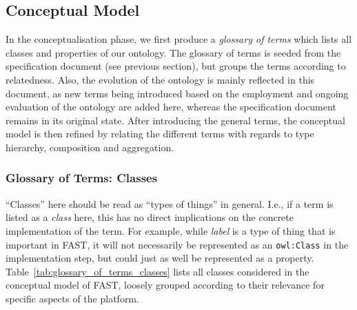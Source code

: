 \documentclass{article}
\begin{document}
\doublespacing


\subsection{Conceptual Model} %
\label{sub:conceptualisation}

In the conceptualisation phase, we first produce a \emph{glossary of terms} which lists all classes and properties of our ontology. The glossary of terms is seeded from the specification document (see previous section), but groups the terms according to relatedness. Also, the evolution of the ontology is mainly reflected in this document, as new terms being introduced based on the employment and ongoing evaluation of the ontology are added here, whereas the specification document remains in its original state. After introducing the general terms, the conceptual model is then refined by relating the different terms with regards to type hierarchy, composition and aggregation.

\subsubsection{Glossary of Terms: Classes} %
\label{subs:classes}

``Classes'' here should be read as ``types of things'' in general. I.e., if a term is listed as a \emph{class} here, this has no direct implications on the concrete implementation of the term. For example, while \emph{label} is a type of thing that is important in FAST, it will not necessarily be represented as an \texttt{owl:Class} in the implementation step, but could just as well be represented as a property. Table~\ref{tab:glossary_of_terms_classes} lists all classes considered in the conceptual model of FAST, loosely grouped according to their relevance for specific aspects of the platform.
\end{document}
